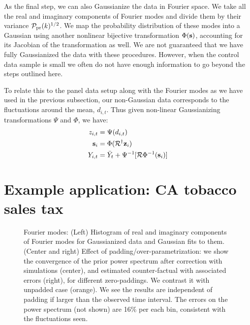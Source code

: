 \documentclass{article}
\def\bz{{\bf z}}
\def\bs{{\bf s}}
\def\pprior{\mathcal{P_{\rm pr}}}
\begin{document}
As the final step, we can also Gaussianize the data in 
Fourier space. We take all the real and imaginary components of Fourier modes and divide 
them by their variance $\pprior(k)^{1/2}$. We 
map the probability distribution of these modes
into a Gaussian using another nonlinear bijective
transformation $\Phi(\bs)$, accounting for its
Jacobian of the transformation as well. 
We are not guaranteed that we have fully Gaussianized the data with these procedures. However, when the 
control data sample is small we often do not have 
enough information to go beyond the steps 
outlined here.

To relate this to the panel data setup along with the Fourier modes as we have used in the previous subsection, our non-Gaussian data corresponds to the fluctuations around the mean, $d_{i, t}$. Thus given non-linear Gaussianizing transformations $\Psi$
and $\Phi$, we have:
\begin{align}
    z_{i, t} &= \Psi(d_{i, t}) \\
    \bs_i &= \Phi(\mathcal R^\dagger \bz_i) \\
    Y_{i,t} &= \bar{Y}_{t} + \Psi^{-1}[\mathcal{R}\Phi^{-1}(\bs_i)]
\end{align}

\section{Example application: CA tobacco sales tax}
\label{sec:results}

\begin{figure}
    \centering
    \caption{Fourier modes: (Left) Histogram of real and imaginary components of Fourier modes for Gaussianized data and Gaussian fits to them. 
    (Center and right) Effect of padding/over-parametrization: we show the convergence of the prior power spectrum after correction with simulations (center), and estimated counter-factual with associated errors (right), for different zero-paddings. We contrast it with unpadded case (orange). We see the results are independent of padding if larger than the observed time interval. 
    The errors on the power spectrum (not shown) are 16\% per each bin, consistent with the fluctuations seen. 
    }
\label{fig:padding}
\end{figure}
\end{document}
